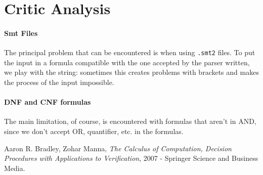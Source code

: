\documentclass[11pt]{article}
\begin{document}
\section{Critic Analysis}
\paragraph{Smt Files}
The principal problem that can be encountered is when using \texttt{.smt2} files. To put the input in a formula compatible with the one accepted by the parser written, we play with the string: sometimes this creates problems with brackets and makes the process of the input impossible.

\paragraph{DNF and CNF formulas}
The main limitation, of course, is encountered with formulas that aren't in AND, since we don't accept OR, quantifier, etc. in the formulas.

\begin{thebibliography}{widest entry}
    Aaron R. Bradley, Zohar Manna, \emph{The Calculus of Computation, Decision Procedures with Applications to Verification}, 2007 - Springer Science and Business Media.
 \end{thebibliography}
\end{document}

